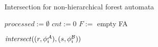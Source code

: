 \begin{algorithm}[ht]
  \caption{Intersection for non-hierarchical forest automata}
\label{alg:isect}

  $\mathit{processed} := \emptyset$\;
  $\mathit{cnt} := 0$\;
  $\mathit{F} :=$ empty FA\;
  
  {
	{
		{
			$\mathit{intersect}((r,\phi_{i}^{\mathcal{A}}),(s,\phi_{i}^{\mathcal{B}}))$\;
		}
	}
  }

  \;
\end{algorithm}



